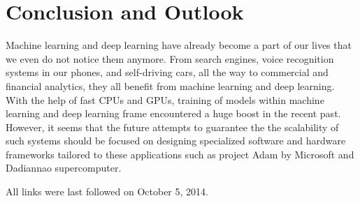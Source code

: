 \documentclass[runningheads,a4paper]{llncs}
\begin{document}
\section*{Conclusion and Outlook}
Machine learning and deep learning  have already become a part of our lives that we even do not notice them anymore. From search engines, voice recognition systems in our phones, and self-driving cars, all the way to commercial and financial analytics, they all benefit from machine learning and deep learning. With the help of fast CPUs and GPUs, training of models within machine learning and deep learning frame encountered a huge boost in the recent past. However, it seems that the future attempts to guarantee the the scalability of such systems should be focused on designing specialized software and hardware frameworks tailored to these applications such as project Adam by Microsoft and Dadiannao supercomputer. 




All links were last followed on October 5, 2014.
\nocite{*}
\end{document}
